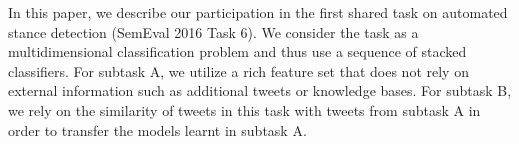 In this paper, we describe our participation in the first shared task on automated stance  detection (SemEval 2016 Task 6). We consider the task as a multidimensional classification problem and thus use a sequence of stacked classifiers. For subtask A, we utilize a rich feature set that does not rely on external information such as additional tweets or knowledge bases. For subtask B, we rely on the similarity of tweets in this task with tweets from subtask A in order to transfer the models learnt in subtask A.

